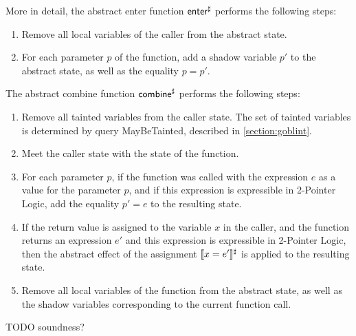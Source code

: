 More in detail, the abstract enter function $\textsf{enter}^\sharp$ performs the following steps:
\begin{enumerate}
    \item Remove all local variables of the caller from the abstract state.
    \item For each parameter $p$ of the function, add a shadow variable $p'$ to the abstract state,
as well as the equality $p = p'$.
\end{enumerate}

The abstract combine function $\textsf{combine}^\sharp$ performs the following steps:
\begin{enumerate}
    \item Remove all tainted variables from the caller state. The set of tainted variables is determined by query \textsf{MayBeTainted}, described in \cref{section:goblint}.
    \item Meet the caller state with the state of the function.
    \item For each parameter $p$, if the function was called with the
    expression $e$ as a value for the parameter $p$, and if this expression is expressible in 2-Pointer Logic,
     add the equality $p' = e$ to the resulting state.
    \item If the return value is assigned to the variable $x$ in the caller,
    and the function returns an expression $e'$ and this expression is expressible in 2-Pointer Logic,
    then the abstract effect of the assignment $\llbracket x = e'\rrbracket^\sharp$ is applied to the resulting state.
    \item Remove all local variables of the function from the abstract state,
    as well as the shadow variables corresponding to the current function call.
\end{enumerate}
TODO soundness?
